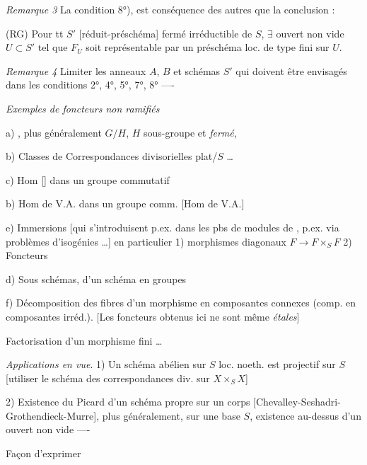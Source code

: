 \documentclass[11pt,a4paper]{article}
\begin{document}
\emph{Remarque 3} La condition 8°), est conséquence des autres
\ill{} \ill{}  que la conclusion \ill{} \ill{} :

(RG) Pour tt $S'$ \struck{\ill{}} [réduit-préschéma] fermé irréductible de
$S$, $\exists$ ouvert non vide $U \subset S'$ tel que $F_U$ soit
représentable par un préschéma loc. de type fini sur $U$.

\emph{Remarque 4} Limiter les anneaux $A$, $B$ et schémas $S'$ \ill{} qui
doivent être envisagés dans les conditions 2°, 4°, 5°, 7°, 8° ----

\emph{Exemples de foncteurs non ramifiés}

a) \ill{} , plus généralement $G/H$, $H$ sous-groupe
 et \emph{fermé},

b) \struck{\ill{}} Classes de Correspondances divisorielles \ill{}
plat/$S$ …

c) Hom [] dans un groupe commutatif

b) Hom de V.A. dans un groupe comm. [Hom de V.A.]

e) Immersions [qui s'introduisent p.ex. dans les pbs de modules
 de  \ill{}, p.ex. via problèmes
d'isogénies …] en particulier 1) morphismes diagonaux
$F \to F \times_S F$ 2) Foncteurs 

d) Sous  schémas, \ill{} d'un schéma en groupes

f) Décomposition des fibres d'un morphisme en composantes connexes
(comp. en composantes irréd.). [Les foncteurs obtenus ici ne sont même
\emph{étales}]

Factorisation d'un morphisme fini  …

\emph{Applications en vue}. 1) Un schéma abélien sur $S$ loc. noeth.
 est projectif sur $S$ [utiliser le schéma des
correspondances div. sur $X \times_S X$]

2) Existence du Picard d'un schéma propre sur un corps
 [Chevalley-Seshadri-Grothendieck-Murre],
plus généralement, sur une base $S$, existence au-dessus d'un ouvert non
vide ----

Façon d'exprimer
\end{document}
